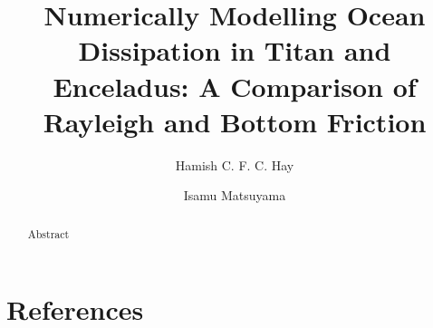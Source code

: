 \documentclass[preprint,3p,twocolumn,times,authoryear]{elsarticle}
\begin{document}
\hypersetup{
     allcolors = MidnightBlue
}

\begin{frontmatter}

\title{Numerically Modelling Ocean Dissipation in Titan and Enceladus: A Comparison of Rayleigh and Bottom Friction}

\author[label1]{Hamish C. F. C. Hay}
\author[label1]{Isamu Matsuyama}
\address[label1]{Lunar and Planetary Laboratory, University of Arizona, Tucson, AZ 85719, United States}

\begin{abstract}

\noindent Abstract

\end{abstract}
\end{frontmatter}











\section*{References}



\end{document}
